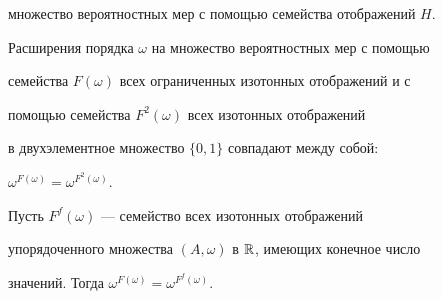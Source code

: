 множество вероятностных мер с помощью семейства отображений $H$. 


 


\begin{thm} 


Расширения порядка $\omega$ на множество вероятностных мер с помощью 


семейства $F(\omega)$ всех ограниченных изотонных отображений и с 


помощью семейства $F^2(\omega)$ всех изотонных отображений 


в двухэлементное множество $\{0,1\}$ совпадают между собой$:$ 


$\omega^{F(\omega)}=\omega^{F^2(\omega)}$. 


\end{thm} 


 


\begin{lem} 


Пусть $F^f(\omega)$ --- семейство всех изотонных отображений 


упорядоченного множества $(A,\omega)$ в $\Bbb R$, имеющих конечное число 


значений. Тогда $\omega^{F(\omega)}=\omega^{F^f(\omega)}$. 


\end{lem} 


 


